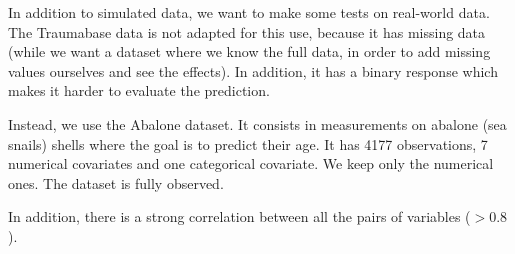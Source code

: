 In addition to simulated data, we want to make some tests on real-world data. The Traumabase data is not adapted for this use, because it has missing data (while we want a dataset where we know the full data, in order to add missing values ourselves and see the effects). In addition, it has a binary response which makes it harder to evaluate the prediction.

Instead, we use the Abalone \cite{nash1994abalone} dataset. It consists in measurements on abalone (sea snails) shells where the goal is to predict their age. It has 4177 observations, 7 numerical covariates and one categorical covariate. We keep only the numerical ones. The dataset is fully observed. 

In addition, there is a strong correlation between all the pairs of variables ($>0.8$).